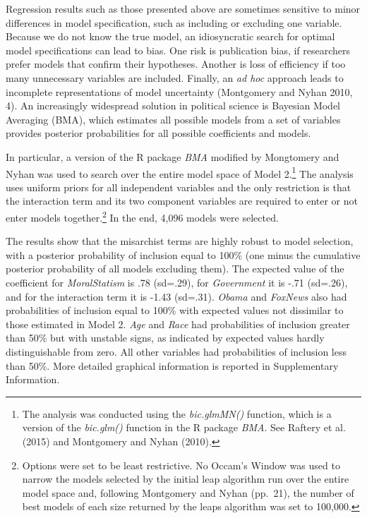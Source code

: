 \documentclass[12pt,]{article}
\begin{document}
Regression results such as those presented above are sometimes sensitive
to minor differences in model specification, such as including or
excluding one variable. Because we do not know the true model, an
idiosyncratic search for optimal model specifications can lead to bias.
One risk is publication bias, if researchers prefer models that confirm
their hypotheses. Another is loss of efficiency if too many unnecessary
variables are included. Finally, an \emph{ad hoc} approach leads to
incomplete representations of model uncertainty (Montgomery and
Nyhan 2010, 4). An increasingly widespread solution in political science
is Bayesian Model Averaging (BMA), which estimates all possible models
from a set of variables provides posterior probabilities for all
possible coefficients and models.

In particular, a version of the R package \emph{BMA} modified by
Mongtomery and Nyhan was used to search over the entire model space of
Model 2.\footnote{The analysis was conducted using the
  \emph{bic.glmMN()} function, which is a version of the
  \emph{bic.glm()} function in the R package \emph{BMA}. See Raftery et
  al. (2015) and Montgomery and Nyhan (2010).} The analysis uses
uniform priors for all independent variables and the only restriction is
that the interaction term and its two component variables are required
to enter or not enter models together.\footnote{Options were set to be
  least restrictive. No Occam's Window was used to narrow the models
  selected by the initial leap algorithm run over the entire model space
  and, following Montgomery and Nyhan (pp.~21), the number of best
  models of each size returned by the leaps algorithm was set to 100,000.}
In the end, 4,096 models were selected.

The results show that the misarchist terms are highly robust to model
selection, with a posterior probability of inclusion equal to 100\% (one
minus the cumulative posterior probability of all models excluding
them). The expected value of the coefficient for \emph{MoralStatism} is
.78 (sd=.29), for \emph{Government} it is -.71 (sd=.26), and for the
interaction term it is -1.43 (sd=.31). \emph{Obama} and \emph{FoxNews}
also had probabilities of inclusion equal to 100\% with expected values
not dissimilar to those estimated in Model 2. \emph{Age} and \emph{Race}
had probabilities of inclusion greater than 50\% but with unstable
signs, as indicated by expected values hardly distinguishable from zero.
All other variables had probabilities of inclusion less than 50\%. More
detailed graphical information is reported in Supplementary Information.
\end{document}
